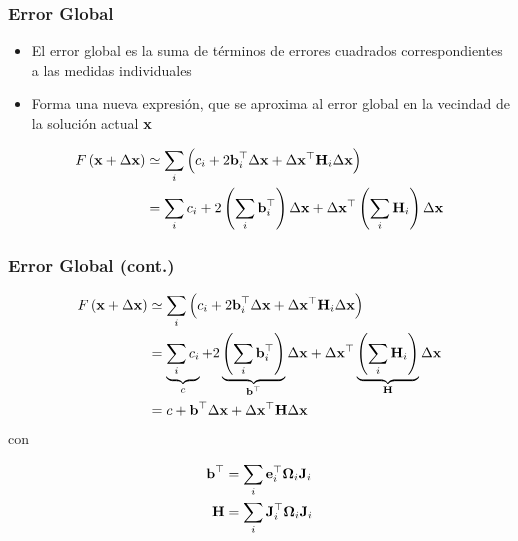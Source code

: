 \begin{frame}
    \frametitle{Error Global}
    
    \begin{itemize}
        \item El error global es la suma de términos de errores cuadrados correspondientes a las medidas individuales
        \item Forma una nueva expresión, que se aproxima al error global en la vecindad de la solución actual $\boldsymbol{\mathbf{x}}$
    \end{itemize}
    
    \begin{align*}
        F\left(\boldsymbol{\mathbf{x}} + \Delta \boldsymbol{\mathbf{x}} \right) &\simeq \sum_{i} \left( c_{i} + 2 \boldsymbol{\mathbf{b}}^{\top}_{i} \Delta \boldsymbol{\mathbf{x}} + \Delta \boldsymbol{\mathbf{x}}^{\top} \boldsymbol{\mathbf{H}}_{i} \Delta \boldsymbol{\mathbf{x}} \right) \\
        &= \sum_{i} c_{i} + 2 \left( \sum_{i} \boldsymbol{\mathbf{b}}^{\top}_{i} \right) \Delta \boldsymbol{\mathbf{x}} + \Delta \boldsymbol{\mathbf{x}}^{\top} \left( \sum_{i} \boldsymbol{\mathbf{H}}_{i} \right) \Delta \boldsymbol{\mathbf{x}}
    \end{align*}
    
    
\end{frame}

\begin{frame}
    \frametitle{Error Global (cont.)}
    
    \begin{align*}
        F\left(\boldsymbol{\mathbf{x}} + \Delta \boldsymbol{\mathbf{x}} \right) &\simeq \sum_{i} \left( c_{i} + 2 \boldsymbol{\mathbf{b}}^{\top}_{i} \Delta \boldsymbol{\mathbf{x}} + \Delta \boldsymbol{\mathbf{x}}^{\top} \boldsymbol{\mathbf{H}}_{i} \Delta \boldsymbol{\mathbf{x}} \right) \\
        &= \underbrace{\sum_{i} c_{i}}_{c} + 2 \underbrace{\left( \sum_{i} \boldsymbol{\mathbf{b}}^{\top}_{i} \right)}_{\boldsymbol{\mathbf{b}}^{\top}} \Delta \boldsymbol{\mathbf{x}} + \Delta \boldsymbol{\mathbf{x}}^{\top} \underbrace{\left( \sum_{i} \boldsymbol{\mathbf{H}}_{i} \right)}_{\boldsymbol{\mathbf{H}}} \Delta \boldsymbol{\mathbf{x}} \\
        &= c + \boldsymbol{\mathbf{b}}^{\top} \Delta \boldsymbol{\mathbf{x}} + \Delta \boldsymbol{\mathbf{x}}^{\top} \boldsymbol{\mathbf{H}} \Delta \boldsymbol{\mathbf{x}}
    \end{align*}
    con
    
    \begin{align*}
        \boldsymbol{\mathbf{b}}^{\top} &= \sum_{i} \boldsymbol{\mathbf{e}}_{i}^{\top} \boldsymbol{\mathbf{\Omega}}_{i} \boldsymbol{\mathbf{J}}_{i} \\ 
        \boldsymbol{\mathbf{H}} &= \sum_{i}  \boldsymbol{\mathbf{J}}_{i}^{\top} \boldsymbol{\mathbf{\Omega}}_{i} \boldsymbol{\mathbf{J}}_{i}
    \end{align*}
    
    
\end{frame}

